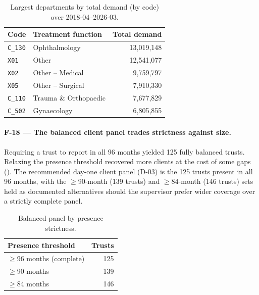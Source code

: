 \documentclass[11pt,a4paper]{article}
\begin{document}
\begin{table}[H]
\centering
\caption{Largest departments by total demand (by code) over 2018-04--2026-03.}
\label{tab:topdept}
\begin{tabular}{llr}
\toprule
Code & Treatment function & Total demand \\
\midrule
\texttt{C\_130} & Ophthalmology            & 13,019,148 \\
\texttt{X01}    & Other                    & 12,541,077 \\
\texttt{X02}    & Other -- Medical         & 9,759,797 \\
\texttt{X05}    & Other -- Surgical        & 7,910,330 \\
\texttt{C\_110} & Trauma \& Orthopaedic    & 7,677,829 \\
\texttt{C\_502} & Gynaecology              & 6,805,855 \\
\bottomrule
\end{tabular}
\end{table}

\paragraph{F-18 --- The balanced client panel trades strictness against size.}
Requiring a trust to report in all 96 months yielded 125 fully balanced trusts.
Relaxing the presence threshold recovered more clients at the cost of some gaps
(). The recommended day-one client panel (D-03) is the 125 trusts
present in all 96 months, with the $\geq$90-month (139 trusts) and $\geq$84-month
(146 trusts) sets held as documented alternatives should the supervisor prefer wider
coverage over a strictly complete panel.

\begin{table}[H]
\centering
\caption{Balanced panel by presence strictness.}
\label{tab:panel}
\begin{tabular}{lr}
\toprule
Presence threshold & Trusts \\
\midrule
$\geq$96 months (complete) & 125 \\
$\geq$90 months            & 139 \\
$\geq$84 months            & 146 \\
\bottomrule
\end{tabular}
\end{table}
\end{document}
